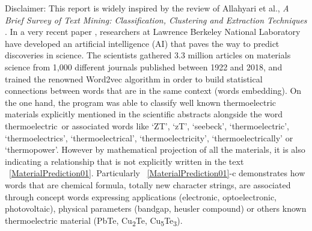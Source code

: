 \label{chap_intro}

Disclaimer: This report is widely inspired by the review of Allahyari et al., \textit{A Brief Survey of Text Mining: Classification, Clustering and Extraction Techniques} \citep{Allahyari2017}.
\newline
\newline
In a very recent paper \citep{Tshitoyan2019}, researchers at Lawrence Berkeley National Laboratory have developed an artificial intelligence (AI) that paves the way to predict discoveries in science.
The scientists gathered 3.3 million articles on materials science from 1,000 different journals published between 1922 and 2018, and trained the renowned Word2vec algorithm in order to build statistical connections between words that are in the same context (\cf words embedding). 
\newline
On the one hand, the program was able to classify well known thermoelectric materials explicitly mentioned in the scientific abstracts alongside the word \doq thermoelectric\deq~or associated words like ‘ZT’, ‘zT’, ‘seebeck’, ‘thermoelectric’, ‘thermoelectrics’, ‘thermoelectrical’, ‘thermoelectricity’, ‘thermoelectrically’ or ‘thermopower’. However by mathematical projection of all the materials, it is also indicating a relationship that is not explicitly written in the text \fig~\ref{MaterialPrediction01}. Particularly \fig~\ref{MaterialPrediction01}-c demonstrates how words that are chemical formula, \ie totally new character strings, are associated through concept words expressing applications (electronic, optoelectronic, photovoltaic), physical parameters (bandgap, heusler compound) or others known thermoelectric material (PbTe, Cu\textsubscript{2}Te, Cu\textsubscript{5}Te\textsubscript{3}). 
